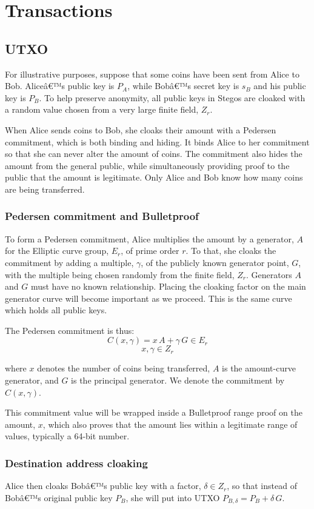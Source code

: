 \documentclass[8pt,fleqn,openany]{book}
\begin{document}
{		\chapter{Transactions}
		
		\section{UTXO}
		For illustrative purposes, suppose that some coins have been sent from Alice to Bob. Aliceâ€™s public key is $P_A$, while Bobâ€™s secret key is $s_B$ and his public key is $P_B$. To help preserve anonymity, all public keys in Stegos are cloaked with a random value chosen from a very large finite field, $Z_r$.
		
		When Alice sends coins to Bob, she cloaks their amount with a Pedersen commitment, which is both binding and hiding. It binds Alice to her commitment so that she can never alter the amount of coins. The commitment also hides the amount from the general public, while simultaneously providing proof to the public that the amount is legitimate. Only Alice and Bob know how many coins are being transferred. 
		
		\subsection{Pedersen commitment and Bulletproof} To form a Pedersen commitment, Alice multiplies the amount by a generator, $A$ for the Elliptic curve group, $E_r$, of prime order $r$. To that, she cloaks the commitment by adding a multiple, $\gamma$, of the publicly known generator point, $G$, with the multiple being chosen randomly from the finite field, $Z_r$. Generators $A$ and $G$ must have no known relationship. Placing the cloaking factor on the main generator curve will become important as we proceed. This is the same curve which holds all public keys. 
		
		The Pedersen commitment is thus:
		$$ C(x, \gamma) = x \, A + \gamma \, G \in E_r$$
		$$x, \gamma \in Z_r$$
		
		where $x$ denotes the number of coins being transferred, $A$ is the amount-curve generator, and $G$ is the principal generator. We denote the commitment by $C(x, \gamma)$. 
		
		This commitment value will be wrapped inside a Bulletproof range proof on the amount, $x$, which also proves that the amount lies within a legitimate range of values, typically a 64-bit number.
		
		\subsection{Destination address cloaking} Alice then cloaks Bobâ€™s public key with a factor, $\delta \in Z_r$, so that instead of Bobâ€™s original public key $P_B$, she will put into UTXO $P_{B, \delta} = P_B + \delta \, G$.
		
}
\end{document}
